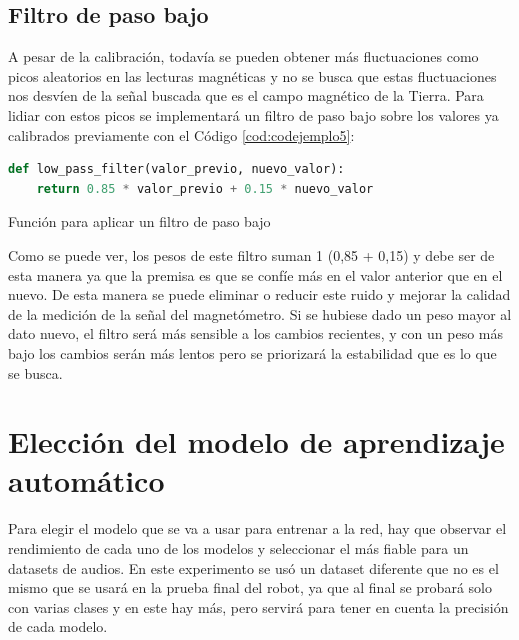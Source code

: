 \subsection{Filtro de paso bajo}
\label{subsec:filtro_paso_bajo}

A pesar de la calibración, todavía se pueden obtener más fluctuaciones como picos aleatorios en las lecturas magnéticas y no se busca que estas fluctuaciones nos desvíen de la señal buscada que es el campo magnético de la Tierra. Para lidiar con estos picos se implementará un filtro de paso bajo sobre los valores ya calibrados previamente con el Código \ref{cod:codejemplo5}:

\begin{code}[H]
\begin{lstlisting}[language=Python]
def low_pass_filter(valor_previo, nuevo_valor):
    return 0.85 * valor_previo + 0.15 * nuevo_valor
\end{lstlisting}
\caption[Función para aplicar un filtro de paso bajo]{Función para aplicar un filtro de paso bajo}
\label{cod:codejemplo5}
\end{code}


Como se puede ver, los pesos de este filtro suman 1 (0,85 + 0,15) y debe ser de esta manera ya que la premisa es que se confíe más en el valor anterior que en el nuevo. De esta manera se puede eliminar o reducir este ruido y mejorar la calidad de la medición de la señal del magnetómetro. Si se hubiese dado un peso mayor al dato nuevo, el filtro será más sensible a los cambios recientes, y con un peso más bajo los cambios serán más lentos pero se priorizará la estabilidad que es lo que se busca.

\section{Elección del modelo de aprendizaje automático}
\label{sec:eleccion_modelo}

Para elegir el modelo que se va a usar para entrenar a la red, hay que observar el rendimiento de cada uno de los modelos y seleccionar el más fiable para un datasets de audios. En este experimento se usó un dataset diferente que no es el mismo que se usará en la prueba final del robot, ya que al final se probará solo con varias clases y en este hay más, pero servirá para tener en cuenta la precisión de cada modelo. \\

